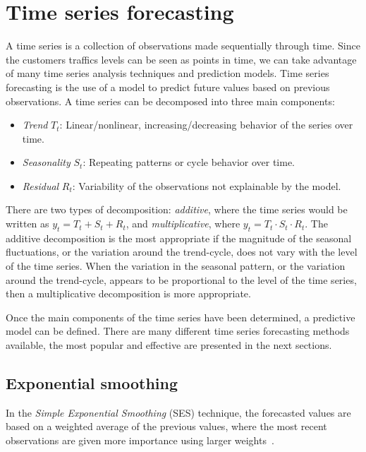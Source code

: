 \section{Time series forecasting}
\label{sec:time_series_forecasting}

A time series is a collection of observations made sequentially through time. Since the customers traffics levels can be seen as points in time, we can take advantage of many time series analysis techniques and prediction models. Time series forecasting is the use of a model to predict future values based on previous observations. A time series can be decomposed into three main components:
\begin{itemize}
  \item \emph{Trend} \( T_t \): Linear/nonlinear, increasing/decreasing behavior of the series over time.
  \item \emph{Seasonality} \( S_t \): Repeating patterns or cycle behavior over time.
  \item \emph{Residual} \( R_t \): Variability of the observations not explainable by the model.
\end{itemize}

There are two types of decomposition: \emph{additive}, where the time series would be written as \( y_t = T_t + S_t + R_t \), and \emph{multiplicative}, where \( y_t = T_t \cdot S_t \cdot R_t \). The additive decomposition is the most appropriate if the magnitude of the seasonal fluctuations, or the variation around the trend-cycle, does not vary with the level of the time series. When the variation in the seasonal pattern, or the variation around the trend-cycle, appears to be proportional to the level of the time series, then a multiplicative decomposition is more appropriate.

Once the main components of the time series have been determined, a predictive model can be defined. There are many different time series forecasting methods available, the most popular and effective are presented in the next sections.

\subsection{Exponential smoothing}
\label{subsec:exponential_smoothing}

In the \emph{Simple Exponential Smoothing} (SES) technique, the forecasted values are based on a weighted average of the previous values, where the most recent observations are given more importance using larger weights~\cite{hyndman2018}.

